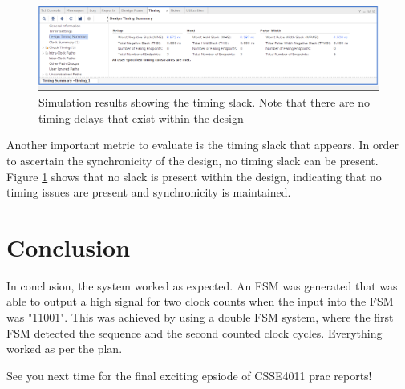 \documentclass[12pt,a4paper]{article}
\begin{document}
\begin{figure}[H]
    \centering
    \includegraphics[scale=0.25]{images/clock_timing.png}
    \caption{Simulation results showing the timing slack. Note that there are no timing delays that exist within the design}
    \label{fig:clock_timing}
\end{figure}

Another important metric to evaluate is the timing slack that appears. In order to ascertain the synchronicity of the design, no timing slack can be present. Figure \ref{fig:clock_timing} shows that no slack is present within the design, indicating that no timing issues are present and synchronicity is maintained.

\section{Conclusion}

In conclusion, the system worked as expected. An FSM was generated that was able to output a high signal for two clock counts when the input into the FSM was "11001". This was achieved by using a double FSM system, where the first FSM detected the sequence and the second counted clock cycles. Everything worked as per the plan. 

See you next time for the final exciting epsiode of CSSE4011 prac reports!
\end{document}
